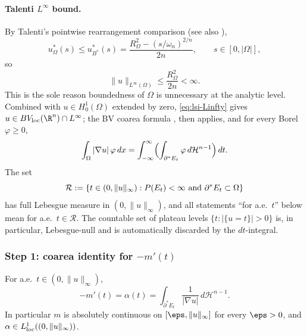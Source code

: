 \paragraph{Talenti $L^{\infty}$ bound.} By Talenti's pointwise
rearrangement comparison \cite[Theorem 1]{Talenti1976}
(see also \cite[Theorem 1.3.2]{Kesavan2006}),
\begin{equation}\label{eq:lsi-talenti}
   u^{*}_{\Omega}(s)\le u^{*}_{B^{*}}(s)
   =\frac{R_{\Omega}^{2}-(s/\omega_{n})^{2/n}}{2n},
   \qquad s\in[0,|\Omega|],
\end{equation}
so
\begin{equation}\label{eq:lsi-Linfty}
   \|u\|_{L^{\infty}(\Omega)}\le \frac{R_{\Omega}^{2}}{2n}<\infty.
\end{equation}
This is the sole reason boundedness of $\Omega$ is unnecessary at the
analytic level. Combined with $u\in H^{1}_{0}(\Omega)$ extended by zero,
\eqref{eq:lsi-Linfty} gives $u\in BV_{\rm loc}(\R^{n})\cap L^{\infty}$;
the BV coarea formula \cite[Theorem 3.40]{AFP2000},
\cite[Theorem 13.1]{Maggi2012} then applies, and for every Borel
$\varphi\ge 0$,
\begin{equation}\label{eq:lsi-coarea}
   \int_{\Omega}|\nabla u|\,\varphi\,dx
   =\int_{-\infty}^{\infty}\Bigl(\int_{\partial^{*}E_{t}}\varphi\,d\mathcal
   H^{n-1}\Bigr)\,dt.
\end{equation}
The set
\[
   \mathcal R:=\{t\in(0,\|u\|_{\infty}):
   P(E_{t})<\infty\hbox{ and }\partial^{*}E_{t}\subset\Omega\}
\]
has full Lebesgue measure in $(0,\|u\|_{\infty})$, and all statements
``for a.e.\ $t$'' below mean for a.e.\ $t\in\mathcal R$. The countable set
of plateau levels $\{t:|\{u=t\}|>0\}$ is, in particular, Lebesgue-null and
is automatically discarded by the $dt$-integral.

\subsubsection{Step 1: coarea identity for $-m'(t)$}
\label{sssec:lsi-coarea}

\begin{lemma}\label{lem:coarea}
For a.e.\ $t\in(0,\|u\|_{\infty})$,
\begin{equation}\label{eq:lsi-L1}
   -m'(t)=\alpha(t)
         =\int_{\partial^{*}E_{t}}\frac{1}{|\nabla u|}\,d\mathcal H^{n-1}.
\end{equation}
In particular $m$ is absolutely continuous on $[\eps,\|u\|_{\infty}]$ for
every $\eps>0$, and $\alpha\in L^{1}_{\rm loc}((0,\|u\|_{\infty}))$.
\end{lemma}

